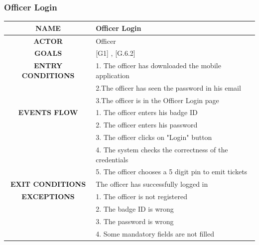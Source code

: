 \documentclass[12pt,a4paper]{article}
\begin{document}
\subsubsection{Officer Login}
		\begin{center}
			\begin{tabular}{| c | l |}
				\hline
				\textbf{NAME} & Officer Login \\
				\hline
				\textbf{ACTOR} & Officer \\
				\hline
				\textbf{GOALS} & [G1] , [G.6.2] \\
				\hline
				\textbf{ENTRY CONDITIONS} &1. The officer has downloaded the mobile application \\
				&2.The officer has seen the password in his email\\
				&3.The officer is in the Officer Login page \\ \hline
				\textbf{EVENTS FLOW}  &
				1. The officer enters his badge ID\\
				&2. The officer enters his password\\
				&3. The officer clicks on "Login" button\\
				&4. The system checks the correctness of the credentials\\
				&5. The officer chooses a 5 digit pin to emit tickets \\ \hline
				\textbf{EXIT CONDITIONS}  & The officer has successfully logged in \\ \hline
				\textbf{EXCEPTIONS} &
				1. The officer is not registered\\
				&2. The badge ID is wrong\\
				&3. The password is wrong\\
				&4. Some mandatory fields are not filled\\
				\hline
			\end{tabular}
		\end{center}
\end{document}
